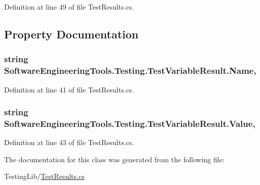 Definition at line 49 of file Test\+Results.\+cs.



\subsection{Property Documentation}
\hypertarget{class_software_engineering_tools_1_1_testing_1_1_test_variable_result_ac2b2e1e50d960902321f03fc0adb6891}{
\subsubsection[{Name}]{\setlength{\rightskip}{0pt plus 5cm}string Software\+Engineering\+Tools.\+Testing.\+Test\+Variable\+Result.\+Name\hspace{0.3cm}{\ttfamily [get]}, {\ttfamily [set]}}}\label{class_software_engineering_tools_1_1_testing_1_1_test_variable_result_ac2b2e1e50d960902321f03fc0adb6891}


Definition at line 41 of file Test\+Results.\+cs.

\hypertarget{class_software_engineering_tools_1_1_testing_1_1_test_variable_result_afcdfe7a68f4156c48a145b53f871d56b}{
\subsubsection[{Value}]{\setlength{\rightskip}{0pt plus 5cm}string Software\+Engineering\+Tools.\+Testing.\+Test\+Variable\+Result.\+Value\hspace{0.3cm}{\ttfamily [get]}, {\ttfamily [set]}}}\label{class_software_engineering_tools_1_1_testing_1_1_test_variable_result_afcdfe7a68f4156c48a145b53f871d56b}


Definition at line 43 of file Test\+Results.\+cs.



The documentation for this class was generated from the following file\+:\begin{DoxyCompactItemize}
\item 
Testing\+Lib/\hyperlink{_test_results_8cs}{Test\+Results.\+cs}\end{DoxyCompactItemize}
